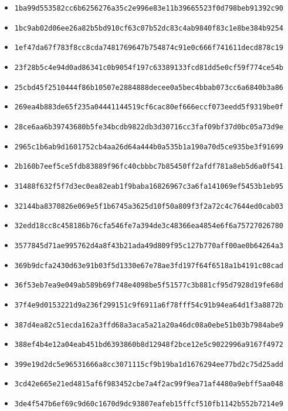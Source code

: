 {\begin{itemize}
    \item \texttt{1ba99d553582cc6b6256276a35c2e996e83e11b39665523f0d798beb91392c90}
    \item \texttt{1bc9ab02d06ee26a82b5bd910cf63c07b52dc83c4ab9840f83c1e8be384b9254}
    \item \texttt{1ef47da67f783f8cc8cda7481769647b754874c91e0c666f741611decd878c19}
    \item \texttt{23f28b5c4e94d0ad86341c0b9054f197c63389133fcd81dd5e0cf59f774ce54b}
    \item \texttt{25cbd45f2510444f86b10507e2884888decee0a5bec4bbab073cc6a6840b3a86}
    \item \texttt{269ea4b883de65f235a04441144519cf6cac80ef666eccf073eedd5f9319be0f}
    \item \texttt{28ce6aa6b39743680b5fe34bcdb9822db3d30716cc3faf09bf37d0bc05a73d9e}
    \item \texttt{2965c1b6ab9d1601752cb4aa26d64a444b0a535b1a190a70d5ce935be3f91699}
    \item \texttt{2b160b7eef5ce5fdb83889f96fc40cbbbc7b85450ff2afdf781a8eb5d6a0f541}
    \item \texttt{31488f632f5f7d3ec0ea82eab1f9baba16826967c3a6fa141069ef5453b1eb95}
    \item \texttt{32144ba8370826e069e5f1b6745a3625d10f50a809f3f2a72c4c7644ed0cab03}
    \item \texttt{32edd18cc8c458186b76cfa546fe7a394de3c48366ea4854e6f6a75727026780}
    \item \texttt{3577845d71ae995762d4a8f43b21ada49d809f95c127b770aff00ae0b64264a3}
    \item \texttt{369b9dcfa2430d63e91b03f5d1330e67e78ae3fd197f64f6518a1b4191c08cad}
    \item \texttt{36f53eb7ea9e049ab589b69f748e4098be5f51577c3b881cf95d7928d19fe68d}
    \item \texttt{37f4e9d0153221d9a236f299151c9f6911a6f78fff54c91b94ea64d1f3a8872b}
    \item \texttt{387d4ea82c51ecda162a3ffd68a3aca5a21a20a46dc08a0ebe51b03b7984abe9}
    \item \texttt{388ef4b4e12a04eab451bd6393860b8d12948f2bce12e5c9022996a9167f4972}
    \item \texttt{399e19d2dc5e96531666a8cc3071115cf9b19ba1d1676294ee77bd2c75d25add}
    \item \texttt{3cd42e665e21ed4815af6f983452cbe7a4f2ac99f9ea71af4480a9ebff5aa048}
    \item \texttt{3de4f547b6ef69c9d60c1670d9dc93807eafeb15ffcf510fb1142b552b7214e9}

\end{itemize}}

